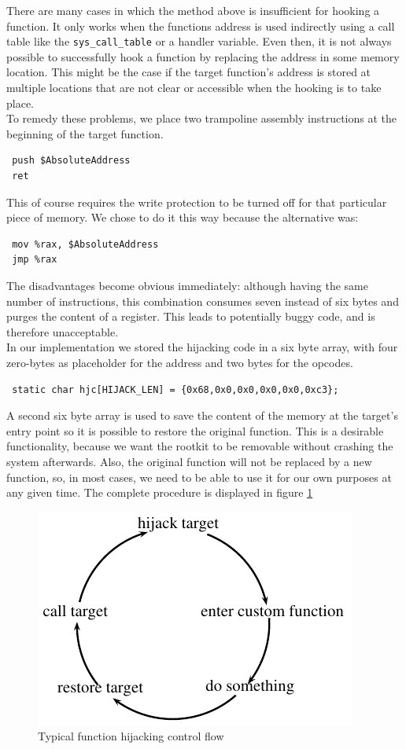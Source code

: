 \label{sec:hij}
There are many cases in which the method above is insufficient for hooking a 
function. It only works when the functions address is used indirectly using a 
call table like the \verb+sys_call_table+ or a handler variable. Even then, it 
is not always possible to successfully hook a function by replacing the address 
in some memory location. This might be the case if the target function's 
address is stored at multiple locations that are not clear or accessible when 
the hooking is to take place.\\
To remedy these problems, we place two trampoline assembly instructions at the 
beginning of the target function.
\lstset{style=customasm}
\begin{lstlisting}
 push $AbsoluteAddress
 ret
\end{lstlisting}
This of course requires the write protection to be turned off for that 
particular piece of memory. We chose to do it this way because the alternative 
was:
\begin{lstlisting}
 mov %rax, $AbsoluteAddress
 jmp %rax
\end{lstlisting}
The disadvantages become obvious immediately: although having the same number 
of instructions, this combination consumes seven instead of six bytes and 
purges the content of a register. This leads to potentially 
buggy code, and is therefore unacceptable.\newline
\hfill\\
In our implementation we stored the hijacking code in a six byte array, with 
four zero-bytes as placeholder for the address and two bytes for the opcodes.
\lstset{style=customc}
\begin{lstlisting}
 static char hjc[HIJACK_LEN] = {0x68,0x0,0x0,0x0,0x0,0xc3};
\end{lstlisting}
A second six byte array is used to save the content of the memory at the 
target's entry point so it is possible to restore the original function.
This is a desirable functionality, because we want the rootkit to be removable 
without crashing the system afterwards. Also, the original function will not be 
replaced by a new function, so, in most cases, we need to be able to use it for 
our own purposes at any given time. The complete procedure is displayed in figure \ref{fig:control}\par
\begin{figure}
\centering
 \includegraphics{control_flow}
 \caption{Typical function hijacking control flow}
 \label{fig:control}
\end{figure}
